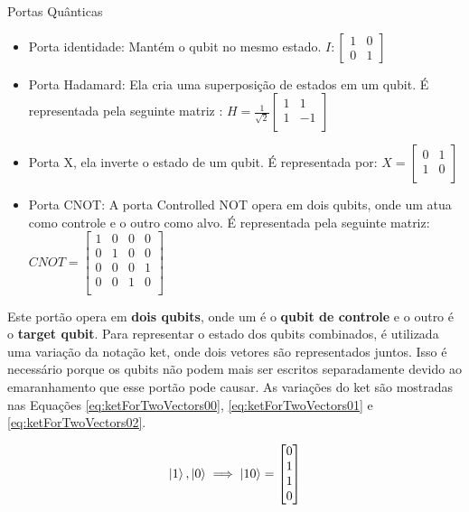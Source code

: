 	\begin{frame}[allowframebreaks]{Portas Quânticas}
		\begin{itemize}
			\item Porta identidade: Mantém o qubit no mesmo estado.
			$I : \begin{bmatrix}
					1& 0 \\
					0& 1
				\end{bmatrix}$
			
			\item Porta Hadamard: Ela cria uma superposição de estados em um qubit. É representada pela seguinte matriz \cite{qcfcs}:
			$H = \frac{1}{\sqrt{2}}\begin{bmatrix}
				1 & 1 \\
				1 & -1 \\
			\end{bmatrix}$
			\item Porta X, ela inverte o estado de um qubit. É representada por:
			$X = \begin{bmatrix}
				0 & 1 \\
				1 & 0 \\
			\end{bmatrix}$
			\item Porta CNOT: A porta Controlled NOT opera em dois qubits, onde um atua como controle e o outro como alvo. É representada pela seguinte matriz:
			$CNOT = \begin{bmatrix}
				1 & 0 & 0 & 0 \\
				0 & 1 & 0 & 0 \\
				0 & 0 & 0 & 1 \\
				0 & 0 & 1 & 0 \\
			\end{bmatrix}$
		\end{itemize}
	
		\par Este portão opera em \textbf{dois qubits}, onde um é o \textbf{qubit de controle} e o outro é o \textbf{target qubit}. Para representar o estado dos qubits combinados, é utilizada uma variação da notação ket, onde dois vetores são representados juntos. Isso é necessário porque os qubits não podem mais ser escritos separadamente devido ao emaranhamento que esse portão pode causar. As variações do ket são mostradas nas Equações \ref{eq:ketForTwoVectors00}, \ref{eq:ketForTwoVectors01} e \ref{eq:ketForTwoVectors02}.
	
		\begin{equation}
			\label{eq:ketForTwoVectors00}
			\ket{1}, \ket{0} \implies
			\ket{10} = \begin{bmatrix}
				0 \\
				1 \\
				1 \\
				0
			\end{bmatrix}				
		\end{equation}
		

\end{frame}
